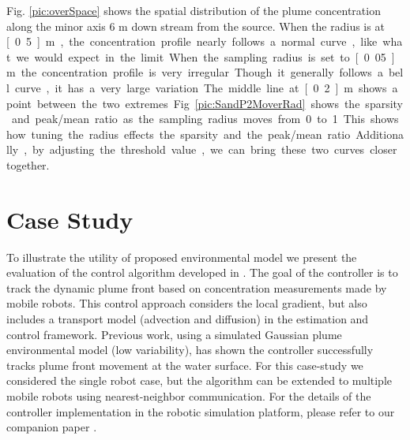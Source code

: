 \documentclass[ letterpaper, 10 pt, conference]{ieeeconf}  %
\begin{document}
Fig. \ref{pic:overSpace} shows the spatial distribution of the plume concentration along the minor axis 6 m down stream from the source.    When the radius is at \unit[0.5]{m}, the concentration profile nearly follows a normal curve, like what we would expect in the limit. When the sampling radius is set to \unit[0.05]{m} the concentration profile is very irregular.  Though it generally follows a bell curve, it has a very large variation.  The middle line at \unit[0.2]{m} shows a point between the two extremes. 

Fig. \ref{pic:SandP2MoverRad} shows the sparsity and peak/mean ratio as the sampling radius moves from 0 to 1. This shows how tuning the radius effects the sparsity and the peak/mean ratio.  Additionally, by adjusting the threshold value, we can bring these two curves closer together.  

\section{Case Study}\label{part:caseStudy}
To illustrate the utility of proposed environmental model we present the evaluation of the control algorithm developed in \cite{Li2014}.  The goal of the controller is to track the dynamic plume front based on concentration measurements made by mobile robots.  This control approach considers the local gradient, but also includes a transport model (advection and diffusion) in the estimation and control framework.  Previous work, using a simulated Gaussian plume environmental model (low variability), has shown the controller successfully tracks plume front movement at the water surface.  For this case-study we considered the single robot case, but the algorithm can be extended to multiple mobile robots using nearest-neighbor communication.  For the details of the controller implementation in the robotic simulation platform, please refer to our companion paper \cite{Fahad2015}.



\end{document}
